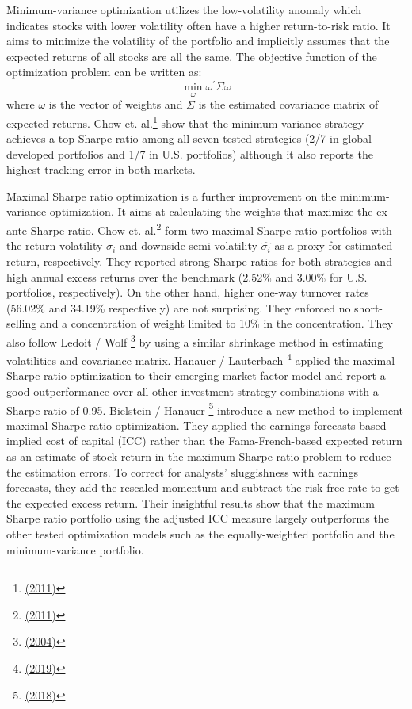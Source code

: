 \documentclass[a4paper,12pt]{article}
\begin{document}
Minimum-variance optimization utilizes the low-volatility anomaly which indicates stocks with lower volatility often have a higher return-to-risk ratio. It aims to minimize the volatility of the portfolio and implicitly assumes that the expected returns of all stocks are all the same. The objective function of the optimization problem can be written as:
\begin{equation}
\tag{3}
\min\limits_{\omega}{\omega^\prime\Sigma\omega}
\end{equation}
where \(\omega\) is the vector of weights and \(\Sigma\) is the estimated covariance matrix of expected returns. Chow et. al.\footnote{\protect\hyperlink{ref-RN88}{(2011)}} show that the minimum-variance strategy achieves a top Sharpe ratio among all seven tested strategies (2/7 in global developed portfolios and 1/7 in U.S. portfolios) although it also reports the highest tracking error in both markets.

Maximal Sharpe ratio optimization is a further improvement on the minimum-variance optimization. It aims at calculating the weights that maximize the ex ante Sharpe ratio. Chow et. al.\footnote{\protect\hyperlink{ref-RN88}{(2011)}} form two maximal Sharpe ratio portfolios with the return volatility \(\sigma_i\) and downside semi-volatility \(\widehat{\sigma_i}\) as a proxy for estimated return, respectively. They reported strong Sharpe ratios for both strategies and high annual excess returns over the benchmark (2.52\% and 3.00\% for U.S. portfolios, respectively). On the other hand, higher one-way turnover rates (56.02\% and 34.19\% respectively) are not surprising. They enforced no short-selling and a concentration of weight limited to 10\% in the concentration. They also follow Ledoit / Wolf \footnote{\protect\hyperlink{ref-RN91}{(2004)}} by using a similar shrinkage method in estimating volatilities and covariance matrix. Hanauer / Lauterbach \footnote{\protect\hyperlink{ref-RN19}{(2019)}} applied the maximal Sharpe ratio optimization to their emerging market factor model and report a good outperformance over all other investment strategy combinations with a Sharpe ratio of 0.95. Bielstein / Hanauer \footnote{\protect\hyperlink{ref-RN36}{(2018)}} introduce a new method to implement maximal Sharpe ratio optimization. They applied the earnings-forecasts-based implied cost of capital (ICC) rather than the Fama-French-based expected return as an estimate of stock return in the maximum Sharpe ratio problem to reduce the estimation errors. To correct for analysts' sluggishness with earnings forecasts, they add the rescaled momentum and subtract the risk-free rate to get the expected excess return. Their insightful results show that the maximum Sharpe ratio portfolio using the adjusted ICC measure largely outperforms the other tested optimization models such as the equally-weighted portfolio and the minimum-variance portfolio.
\end{document}
